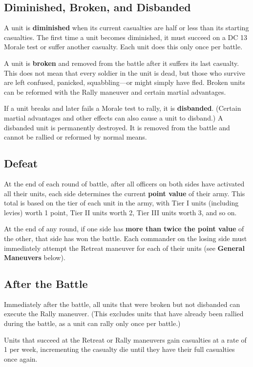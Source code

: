 \documentclass[10pt,a4paper,twoside,bg=print,twocolumn,openany,nodeprecatedcode]{dndbook}
\begin{document}
\subsection{Diminished, Broken, and Disbanded}
A unit is \textbf{diminished} when its current casualties are half or less than its starting casualties. The first time a unit becomes diminished, it must succeed on a DC 13 Morale test or suffer another casualty. Each unit does this only once per battle.

A unit is \textbf{broken} and removed from the battle after it suffers its last casualty. This does not mean that every soldier in the unit is dead, but those who survive are left confused, panicked, squabbling—or might simply have fled. Broken units can be reformed with the Rally maneuver and certain martial advantages.

If a unit breaks and later fails a Morale test to rally, it is \textbf{disbanded}. (Certain martial advantages and other effects can also cause a unit to disband.) A disbanded unit is permanently destroyed. It is removed from the battle and cannot be rallied or reformed by normal means.

\subsection{Defeat}
At the end of each round of battle, after all officers on both sides have activated all their units, each side determines the current \textbf{point value} of their army. This total is based on the tier of each unit in the army, with Tier I units (including levies) worth 1 point, Tier II units worth 2, Tier III units worth 3, and so on.

At the end of any round, if one side has \textbf{more than twice the point value} of the other, that side has won the battle. Each commander on the losing side must immediately attempt the Retreat maneuver for each of their units (see \textbf{General Maneuvers} below).

\subsection{After the Battle}
Immediately after the battle, all units that were broken but not disbanded can execute the Rally maneuver. (This excludes units that have already been rallied during the battle, as a unit can rally only once per battle.)

Units that succeed at the Retreat or Rally maneuvers gain casualties at a rate of 1 per week, incrementing the casualty die until they have their full casualties once again.
\end{document}
